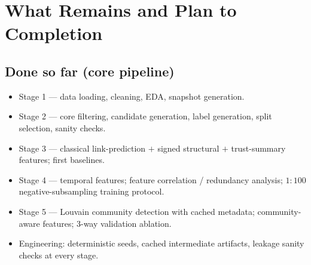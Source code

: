 \documentclass[11pt,a4paper]{article}
\begin{document}
\section{What Remains and Plan to Completion}

\subsection{Done so far (core pipeline)}
\begin{itemize}[nosep]
  \item Stage 1 --- data loading, cleaning, EDA, snapshot generation.
  \item Stage 2 --- core filtering, candidate generation, label generation,
        split selection, sanity checks.
  \item Stage 3 --- classical link-prediction $+$ signed structural $+$
        trust-summary features; first baselines.
  \item Stage 4 --- temporal features; feature correlation / redundancy
        analysis; $1{:}100$ negative-subsampling training protocol.
  \item Stage 5 --- Louvain community detection with cached metadata;
        community-aware features; 3-way validation ablation.
  \item Engineering: deterministic seeds, cached intermediate artifacts,
        leakage sanity checks at every stage.
\end{itemize}
\end{document}
